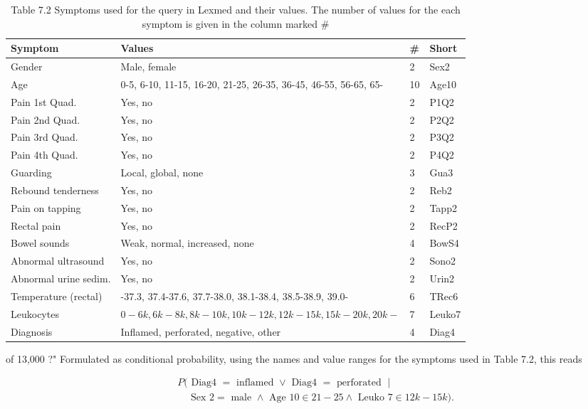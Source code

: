 \documentclass[10pt]{article}
\begin{document}
\begin{table}[h]
\begin{center}
\captionsetup{labelformat=empty}
\caption{Table 7.2 Symptoms used for the query in Lexmed and their values. The number of values for the each symptom is given in the column marked \#}
\begin{tabular}{|l|l|l|l|}
\hline
Symptom & Values & \# & Short \\
\hline
Gender & Male, female & 2 & Sex2 \\
\hline
Age & 0-5, 6-10, 11-15, 16-20, 21-25, 26-35, 36-45, 46-55, 56-65, 65- & 10 & Age10 \\
\hline
Pain 1st Quad. & Yes, no & 2 & P1Q2 \\
\hline
Pain 2nd Quad. & Yes, no & 2 & P2Q2 \\
\hline
Pain 3rd Quad. & Yes, no & 2 & P3Q2 \\
\hline
Pain 4th Quad. & Yes, no & 2 & P4Q2 \\
\hline
Guarding & Local, global, none & 3 & Gua3 \\
\hline
Rebound tenderness & Yes, no & 2 & Reb2 \\
\hline
Pain on tapping & Yes, no & 2 & Tapp2 \\
\hline
Rectal pain & Yes, no & 2 & RecP2 \\
\hline
Bowel sounds & Weak, normal, increased, none & 4 & BowS4 \\
\hline
Abnormal ultrasound & Yes, no & 2 & Sono2 \\
\hline
Abnormal urine sedim. & Yes, no & 2 & Urin2 \\
\hline
Temperature (rectal) & -37.3, 37.4-37.6, 37.7-38.0, 38.1-38.4, 38.5-38.9, 39.0- & 6 & TRec6 \\
\hline
Leukocytes & $0-6 k, 6 k-8 k, 8 k-10 k, 10 k-12 k, 12 k-15 k, 15 k-20 k, 20 k-$ & 7 & Leuko7 \\
\hline
Diagnosis & Inflamed, perforated, negative, other & 4 & Diag4 \\
\hline
\end{tabular}
\end{center}
\end{table}

of 13,000 ?" Formulated as conditional probability, using the names and value ranges for the symptoms used in Table 7.2, this reads

$$
\begin{aligned}
& P(\text { Diag4 }=\text { inflamed } \vee \text { Diag4 }=\text { perforated } \mid \\
& \quad \text { Sex } 2=\text { male } \wedge \text { Age } 10 \in 21-25 \wedge \text { Leuko } 7 \in 12 k-15 k) .
\end{aligned}
$$
\end{document}
